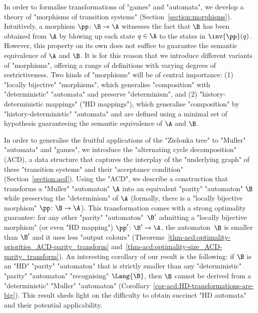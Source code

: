 \documentclass[10pt,a4paper]{amsart}
\newenvironment{longdescription} %
{\begin{description}[style=unboxed]}
	{\end{description}}
\begin{document}
\begin{longdescription}
	
	\item[2. Introducing morphisms as witnesses of transformations.] In order to formalise transformations of "games" and "automata", we develop a theory of "morphisms of transition systems" (Section~\ref{section:morphisms}). Intuitively, a morphism $\pp\colon \B\to \A$ witnesses the fact that $\B$ has been obtained from $\A$ by blowing up each state $q\in \A$ to the states in $\inv{\pp}(q)$. However, this property on its own does not suffice to guarantee the semantic equivalence of $\A$ and $\B$. It is for this reason that we introduce different variants of "morphisms", offering a range of definitions with varying degrees of restrictiveness. Two kinds of "morphisms" will be of central importance: (1) "locally bijective" "morphisms", which generalise "composition" with "deterministic" "automata" and preserve "determinism", and (2) "history-deterministic mappings" ("HD mappings"), which generalise "composition" by "history-deterministic" "automata" and are defined using a minimal set of hypothesis guaranteeing the semantic equivalence of $\A$ and $\B$.

	
	\item[3. The alternating cycle decomposition and optimal transformations of Muller transition systems.] In order to generalise the fruitful applications of the "Zielonka tree" to "Muller" "automata" and "games", we introduce the "alternating cycle decomposition" (ACD), a data structure that captures the interplay of the "underlying graph" of these "transition systems" and their "acceptance condition"  (Section~\ref{section:acd}). Using the "ACD", we describe a construction that transforms a "Muller" "automaton" $\A$ into an equivalent "parity" "automaton" $\B$ while preserving the "determinism" of $\A$ (formally, there is a "locally bijective morphism" $\pp\colon \B\to \A$). This transformation comes with a strong optimality guarantee: for any other "parity" "automaton"~$\B'$ admitting a "locally bijective morphism" (or even "HD mapping") $\pp'\colon \B'\to \A$, the automaton~$\B$ is smaller than $\B'$ and it uses less "output colours" (Theorems~\ref{thm-acd:optimality-priorities_ACD-parity_transform} and~\ref{thm-acd:optimality-size_ACD-parity_transform}).
	An interesting corollary of our result is the following: if $\B$ is an "HD" "parity" "automaton" that is strictly smaller than any "deterministic" "parity" "automaton" "recognising" $\Lang{\B}$, then $\B$ cannot be derived from a "deterministic" "Muller" "automaton" (Corollary~\ref{cor-acd:HD-transformations-are-big}). This result sheds light on the difficulty to obtain succinct "HD automata" and their potential applicability.
	

\end{longdescription}
\end{document}
